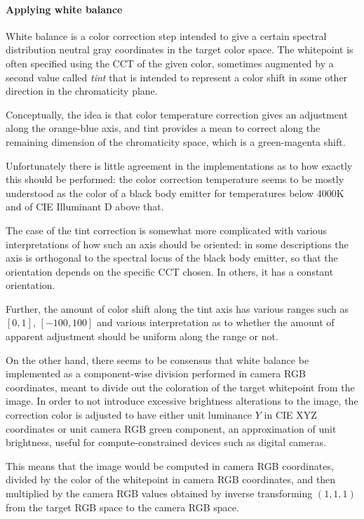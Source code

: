 \paragraph{Applying white balance}
White balance is a color correction step intended to give a certain spectral distribution 
 neutral gray coordinates in the target color space.
The whitepoint is often specified using the \gls{CCT} of the given color,
sometimes augmented by a second value called \textsl{tint} that is intended to represent a color shift 
in some other direction in the chromaticity plane. 
    
Conceptually, the idea is that color temperature correction gives an adjustment along the orange-blue axis, 
and tint provides a mean to correct along the remaining dimension of the chromaticity space, 
which is a green-magenta shift.

Unfortunately there is little agreement in the implementations as to how exactly this should be performed:
the color correction temperature seems to be mostly understood as the color of a black body emitter for
temperatures below $4000\unit{\kelvin}$ and of \gls{CIE} Illuminant D above that. 

The case of the tint correction is somewhat more complicated with various interpretations 
of how such an axis should be oriented: in some descriptions the axis is orthogonal to the 
spectral locus of the black body emitter, so that the orientation depends on the specific 
\gls{CCT} chosen. In others, it has a constant orientation. 

Further, the amount of color shift along the tint axis has various ranges such as $[0,1]$, 
$[-100,100]$ and various interpretation as to whether the amount of apparent adjustment should be 
uniform along the range or not.

On the other hand, there seems to be consensus that white balance be implemented as a component-wise
division performed in camera \gls{RGB} coordinates, meant to divide out the coloration of the target
whitepoint from the image. In order to not introduce excessive brightness alterations
to the image, the correction color is adjusted to have either unit luminance $Y$ in \gls{CIE} \gls{XYZ} 
coordinates or unit camera \gls{RGB} green component, an approximation of unit brightness, 
useful for compute-constrained devices such as digital cameras. 

This means that the image would be computed in camera \gls{RGB} coordinates, divided by the color of 
the whitepoint in camera \gls{RGB} coordinates, and then multiplied by the camera \gls{RGB} values 
obtained by inverse transforming $(1,1,1)$ from the target \gls{RGB} space to the camera \gls{RGB} 
space.

